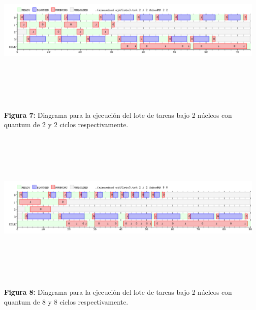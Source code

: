 \documentclass[a4paper]{article}
\begin{document}
 \includegraphics[width=\textwidth,height=3.0in,keepaspectratio]{imagenes/ej4/eje1.png} \\
\begin {flushleft}
\textbf{Figura 7:} Diagrama para la ejecuci\'on del lote de tareas bajo 2 n\'ucleos con quantum de 2 y 2 ciclos respectivamente.
\end{flushleft}

 \includegraphics[width=\textwidth,height=3.0in,keepaspectratio]{imagenes/ej4/eje2.png} \\
\begin {flushleft}
\textbf{Figura 8:} Diagrama para la ejecuci\'on del lote de tareas bajo 2 n\'ucleos con quantum de 8 y 8 ciclos respectivamente.
\end{flushleft}
\end{document}
